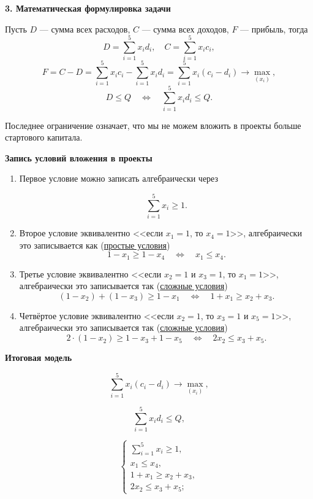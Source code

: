\bigskip

\textbf{3. Математическая формулировка задачи}

Пусть $D$ --- сумма всех расходов, $C$ --- сумма всех доходов, $F$ --- прибыль, тогда
\[
D = \sum_{i=1}^5 x_i d_i, \quad C = \sum_{i=1}^5 x_i c_i,
\]
\[
F = C - D = \sum_{i=1}^5 x_i c_i - \sum_{i=1}^5 x_i d_i = \sum_{i=1}^5 x_i (c_i - d_i) \to \max_{(x_i)},
\]
\[
D \le Q \quad \Longleftrightarrow \quad \sum_{i=1}^5 x_i d_i \le Q.
\]

Последнее ограничение означает, что мы не можем вложить в проекты больше стартового капитала.

\bigskip

\textbf{Запись условий вложения в проекты}

\begin{enumerate}[nosep]
	\item Первое условие можно записать алгебраически через
	
	\[
	\sum_{i=1}^{5} x_i \ge 1.
	\]
	
	\item Второе условие эквивалентно <<если $x_1 = 1$, то $x_4 = 1$>>, алгебраически это записывается как (\hyperref[fact:simple_conditions]{простые условия})
	\[
	1 - x_1 \ge 1 - x_4 \quad \Longleftrightarrow \quad x_1 \le x_4.
	\]
	
	\item Третье условие эквивалентно <<если $x_2 = 1$ и $x_3 = 1$, то $x_1 = 1$>>, алгебраически это записывается так (\hyperref[fact:complex_conditions]{сложные условия})
	\[
	(1 - x_2) + (1 - x_3) \ge 1 - x_1 \quad \Longleftrightarrow \quad 1 + x_1 \ge x_2 + x_3.
	\]
	
	\item Четвёртое условие эквивалентно <<если $x_2 = 1$, то $x_3 = 1$ и $x_5 = 1$>>, алгебраически это записывается так (\hyperref[fact:complex_conditions]{сложные условия})
	\[
	2 \cdot (1 - x_2) \ge 1 - x_3 + 1 - x_5 \quad \Longleftrightarrow \quad 2x_2 \le x_3 + x_5.
	\]
\end{enumerate}

\bigskip

\textbf{Итоговая модель}

\[
\sum_{i=1}^5 x_i (c_i - d_i) \to \max_{(x_i)},
\]

\[
\sum_{i=1}^5 x_i d_i \le Q,
\]

\[
\begin{cases}
	\sum\limits_{i=1}^{5} x_i \ge 1, \\
	x_1 \le x_4, \\
	1 + x_1 \ge x_2 + x_3, \\
	2x_2 \le x_3 + x_5;
\end{cases}
\]

